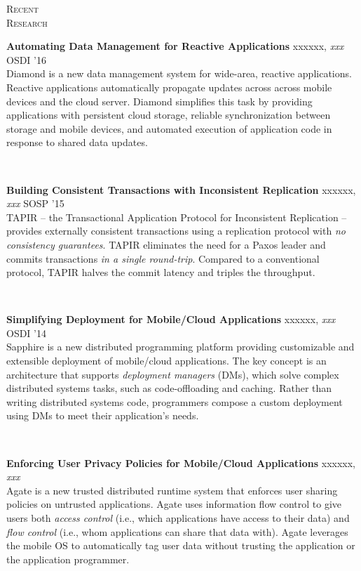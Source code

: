 \documentclass[10pt,times]{report}
\newlength{\sectiongap}
\newlength{\entrygap}
\newlength{\sectioncolwidth}
\newlength{\colgap}
\newlength{\stuffwidth}
\def\ifEqString#1#2{\def\testa{#1}\def\testb{#2}%
  \ifx\testa\testb}
\newenvironment{rtable}{
  \begin{minipage}{\textwidth}
  }{
  \end{minipage}
}
\newenvironment{rentry}[3][xxx]{
  \begin{minipage}[t]{\hsize}
    \textbf{#2}\ifEqString{#1}{xxx}\relax\else, \textit{#1}\fi
    \hspace{\stretch{1}} #3 \\
  }{
    \removelastskip
  \end{minipage}
  \\[\entrygap]  %
}
\newenvironment{rsection}[1]{
  \begin{minipage}[t]{\sectioncolwidth}
    \textsc{#1}
  \end{minipage}
  \hspace{\colgap}
  \begin{minipage}[t]{\stuffwidth}
  }{
    \removelastskip
  \end{minipage}
  \\[\sectiongap]
}
\begin{document}
\begin{rtable}
  \begin{rsection}{Recent\\Research}
    \begin{rentry}{Automating Data Management for Reactive
        Applications}{OSDI '16}
      Diamond is a new data management system for wide-area, reactive
      applications. Reactive applications automatically propagate
      updates across across mobile devices and the cloud
      server. Diamond simplifies this task by providing applications
      with persistent cloud storage, reliable synchronization between
      storage and mobile devices, and automated execution of
      application code in response to shared data updates.
    \end{rentry}

    \begin{rentry}{Building Consistent Transactions with Inconsistent
        Replication}{SOSP '15}
      TAPIR -- the Transactional Application Protocol for Inconsistent
      Replication -- provides externally consistent transactions using
      a replication protocol with \emph{no consistency guarantees}.
      TAPIR eliminates the need for a Paxos leader and
      commits transactions \emph{in a single round-trip}. Compared to
      a conventional protocol, TAPIR halves the commit latency and
      triples the throughput.
    \end{rentry}

    \begin{rentry}{Simplifying Deployment for Mobile/Cloud Applications}{OSDI '14}
      Sapphire is a new distributed programming platform providing
      customizable and extensible deployment of mobile/cloud
      applications. The key concept is an architecture that supports
      \emph{deployment managers} (DMs), which solve complex
      distributed systems tasks, such as code-offloading and
      caching. Rather than writing distributed systems code,
      programmers compose a custom deployment using DMs to meet their
      application's needs.
    \end{rentry}

    \begin{rentry}{Enforcing User Privacy Policies for Mobile/Cloud
        Applications}{}
      Agate is a new trusted distributed runtime system that enforces
      user sharing policies on untrusted applications.  Agate uses
      information flow control to give users both \emph{access
        control} (i.e., which applications have access to their data)
      and \emph{flow control} (i.e., whom applications can share that
      data with).  Agate leverages the mobile OS to automatically tag
      user data without trusting the application or the application
      programmer.
    \end{rentry}


\end{rsection}
\end{rtable}
\end{document}
